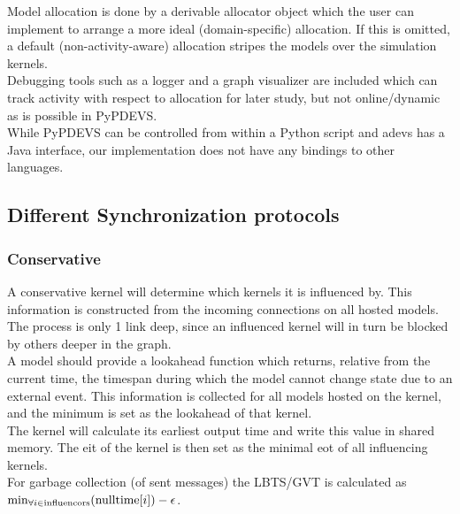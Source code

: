 Model allocation is done by a derivable allocator object which the user can implement to arrange a more ideal (domain-specific) allocation. If this is omitted, a default (non-activity-aware) allocation stripes the models over the simulation kernels.\\
Debugging tools such as a logger and a graph visualizer are included which can track activity with respect to allocation for later study, but not online/dynamic as is possible in PyPDEVS.\\
While PyPDEVS can be controlled from within a Python script and adevs has a Java interface, our implementation does not have any bindings to other languages.

\subsection{Different Synchronization protocols}
\subsubsection{Conservative}
A conservative kernel will determine which kernels it is influenced by. This information is constructed from the incoming connections on all hosted models. The process is only 1 link deep, since an influenced kernel will in turn be blocked by others deeper in the graph.\\
A model should provide a lookahead function which returns, relative from the current time, the timespan during which the model cannot change state due to an external event. This information is collected for all models hosted on the kernel, and the minimum is set as the lookahead of that kernel. \\
The kernel will calculate its earliest output time and write this value in shared memory. The eit of the kernel is then set as the minimal eot of all influencing kernels. \\
For garbage collection (of sent messages) the LBTS/GVT is calculated as $\min_{\forall i \in \textup{influencors}}( \textup{nulltime}[i])  - \epsilon $. %

